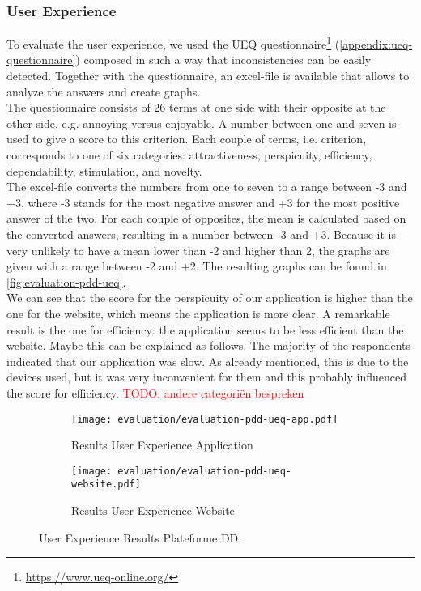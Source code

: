 \subsubsection{User Experience}
To evaluate the user experience, we used the UEQ questionnaire\footnote{\url{https://www.ueq-online.org/}} (\autoref{appendix:ueq-questionnaire}) composed in such a way that inconsistencies can be easily detected. Together with the questionnaire, an excel-file is available that allows to analyze the answers and create graphs.\\

The questionnaire consists of 26 terms at one side with their opposite at the other side, e.g. annoying versus enjoyable. A number between one and seven is used to give a score to this criterion. Each couple of terms, i.e. criterion, corresponds to one of six categories: attractiveness, perspicuity, efficiency, dependability, stimulation, and novelty.\\

The excel-file converts the numbers from one to seven to a range between -3 and +3, where -3 stands for the most negative answer and +3 for the most positive answer of the two. For each couple of opposites, the mean is calculated based on the converted answers, resulting in a number between -3 and +3. Because it is very unlikely to have a mean lower than -2 and higher than 2, the graphs are given with a range between -2 and +2. The resulting graphs can be found in \autoref{fig:evaluation-pdd-ueq}.\\

We can see that the score for the perspicuity of our application is higher than the one for the website, which means the application is more clear. A remarkable result is the one for efficiency: the application seems to be less efficient than the website. Maybe this can be explained as follows. The majority of the respondents indicated that our application was slow. As already mentioned, this is due to the devices used, but it was very inconvenient for them and this probably influenced the score for efficiency. \textcolor{red}{TODO: andere categori\"en bespreken}

\begin{figure}[h]
	\centering
	\begin{subfigure}{.49\textwidth}
  		\centering
  		\texttt{[image: evaluation/evaluation-pdd-ueq-app.pdf]}
  		\caption{Results User Experience Application}
	\end{subfigure}%
	\begin{subfigure}{.49\textwidth}
  		\centering
  		\texttt{[image: evaluation/evaluation-pdd-ueq-website.pdf]}
  		\caption{Results User Experience Website}
	\end{subfigure}
	\caption{User Experience Results Plateforme DD.}
	\label{fig:evaluation-pdd-ueq}
\end{figure}




